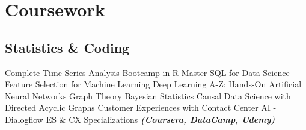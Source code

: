\documentclass[letterpaper]{deedy-resume_sm} %
\begin{document}
\section{Coursework}
\subsection{Statistics \& Coding}
Complete Time Series Analysis Bootcamp in R \textbullet{} Master SQL for Data Science \textbullet{} Feature Selection for Machine Learning \textbullet{} Deep Learning A-Z: Hands-On Artificial Neural Networks \textbullet{} Graph Theory \textbullet{} Bayesian Statistics \textbullet{} Causal Data Science with Directed Acyclic Graphs \textbullet{} Customer Experiences with Contact Center AI - Dialogflow ES \& CX Specializations {\footnotesize \textit{\textbf{(Coursera, DataCamp, Udemy)}}}
\end{document}
